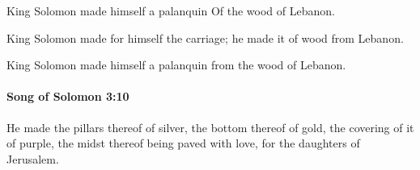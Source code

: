 			\begin{versebox}
					\item[BHS] 
					\item[LXX] 
					\item[ASV] King Solomon made himself a palanquin Of the wood of Lebanon.
					\item[NIV] King Solomon made for himself the carriage; he made it of wood from Lebanon.
					\item[NRSV] King Solomon made himself a palanquin from the wood of Lebanon.
			\end{versebox}

		\paragraph{Song of Solomon 3:10} %
			\label{SONGOFSOLOMON-3-10}

			He made the pillars thereof of silver, the bottom thereof of gold, the covering of it of purple, the midst thereof being paved with love, for the daughters of Jerusalem.

